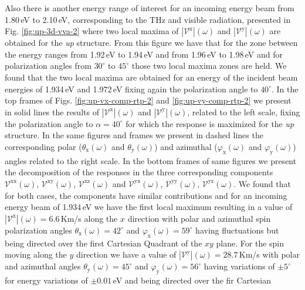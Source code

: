 \documentclass[prb,11pt,tightenlines,twocolumn,aps]{revtex4-1}
\begin{document}
Also there is another energy range of interest for an incoming energy beam from
1.80\,eV to 2.10\,eV, corresponding to the THz and visible radiation, presented
in Fig. \ref{fig:up-3d-vva-2} where two local maxima of
$|\mathcal{V}^{\mathrm{x}}|(\omega)$ and $|\mathcal{V}^{\mathrm{y}}|(\omega)$
are obtained for the \emph{up} structure.
% 
From this figure we have that for the zone between the energy ranges from
1.92\,eV to 1.94\,eV and from 1.96\,eV to 1.98\,eV and for polarization angles
from $30^{\circ}$ to $45^{\circ}$ those two local maxima zones are held.
% 
We found that the two local maxima are obtained for an energy of the incident
beam energies of 1.934\,eV and 1.972\,eV fixing again the polarization angle to
$40^{\circ}$. 
In the top frames of Figs. \ref{fig:up-vx-comp-rtp-2} and 
% 
\ref{fig:up-vy-comp-rtp-2} we present in solid lines the results of
$|\mathcal{V}^{\mathrm{x}}|(\omega)$ and $|\mathcal{V}^{\mathrm{y}}|(\omega)$,
related to the left scale, fixing the polarization angle to $\alpha=40^{\circ}$
for which the response is maximized for the \emph{up} structure. In the same
figures and frames we present in dashed lines the corresponding polar
($\theta_{\mathrm{x}}(\omega)$ and $\theta_{\mathrm{y}}(\omega)$) and azimuthal
($\varphi_{\mathrm{x}}(\omega)$ and $\varphi_{\mathrm{y}}(\omega)$) angles
related to the right scale. In the bottom frames of same figures we present the
decomposition of the responses in the three corresponding components
$\mathcal{V}^{\mathrm{xx}}(\omega)$, $\mathcal{V}^{\mathrm{xy}}(\omega)$,
$\mathcal{V}^{\mathrm{xz}}(\omega)$ and $\mathcal{V}^{\mathrm{yx}}(\omega)$,
$\mathcal{V}^{\mathrm{yy}}(\omega)$, $\mathcal{V}^{\mathrm{yz}}(\omega)$. 
% 
We found that for both cases, the components have similar contributions and for
an incoming energy beam of 1.934\,eV  we have the first local maximum resulting
in a value of $|\mathcal{V}^{\mathrm{x}}|(\omega)= 6.6$\,Km/s along the $x$
direction  with polar and azimuthal spin polarization angles
$\theta_{\mathrm{x}}(\omega)= 42^{\circ}$ and
$\varphi_{\mathrm{x}}(\omega)=59^{\circ}$ having fluctuations but being directed
over the first Cartesian Quadrant of the $xy$ plane.
% 
For the spin moving along the $y$ direction we have a value of
$|\mathcal{V}^{\mathrm{y}}|(\omega)=28.7$\,Km/s with polar and azimuthal angles
$\theta_{\mathrm{y}}(\omega)=45^{\circ}$ and
$\varphi_{\mathrm{y}}(\omega)=56^{\circ}$ having variations of $\pm5^{\circ}$
for energy variations of $\pm0.01$\,eV and being directed over the fir Cartesian
\end{document}
